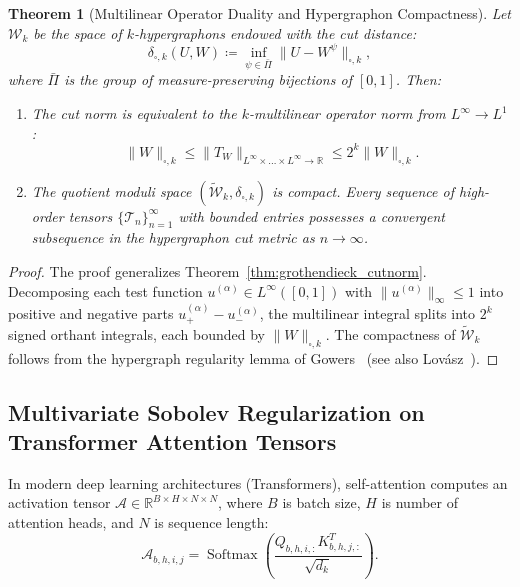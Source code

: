 \documentclass[11pt,a4paper,reqno]{amsart}
\newtheorem{theorem}{Theorem}[section]
\theoremstyle{definition}
\numberwithin{equation}{section}
\providecommand{\R}{\mathbb{R}}
\providecommand{\R}{\mathbb{R}}
\begin{document}
\begin{theorem}[Multilinear Operator Duality and Hypergraphon Compactness]
\label{thm:hypergraphon_compactness}
Let $\mathcal{W}_k$ be the space of $k$-hypergraphons endowed with the cut distance:
\begin{equation}
    \delta_{\square, k}(U, W) \coloneqq \inf_{\psi \in \bar{\Pi}} \|U - W^\psi\|_{\square, k},
\end{equation}
where $\bar{\Pi}$ is the group of measure-preserving bijections of $[0, 1]$. Then:
\begin{enumerate}[label=(\roman*)]
    \item The cut norm is equivalent to the $k$-multilinear operator norm from $L^\infty \to L^1$:
    \begin{equation}
        \|W\|_{\square, k} \le \|T_W\|_{L^\infty \times \dots \times L^\infty \to \R} \le 2^k \|W\|_{\square, k}.
    \end{equation}
    \item The quotient moduli space $(\widetilde{\mathcal{W}}_k, \delta_{\square, k})$ is \emph{compact}. Every sequence of high-order tensors $\{\mathcal{T}_n\}_{n=1}^\infty$ with bounded entries possesses a convergent subsequence in the hypergraphon cut metric as $n \to \infty$.
\end{enumerate}
\end{theorem}
\begin{proof}
The proof generalizes Theorem~\ref{thm:grothendieck_cutnorm}. Decomposing each test function $u^{(\alpha)} \in L^\infty([0, 1])$ with $\|u^{(\alpha)}\|_\infty \le 1$ into positive and negative parts $u_+^{(\alpha)} - u_-^{(\alpha)}$, the multilinear integral splits into $2^k$ signed orthant integrals, each bounded by $\|W\|_{\square, k}$. The compactness of $\widetilde{\mathcal{W}}_k$ follows from the hypergraph regularity lemma of Gowers~\cite{gowers2007hypergraph} (see also Lov{\'a}sz~\cite{lovasz2012large}).
\end{proof}

\subsection{Multivariate Sobolev Regularization on Transformer Attention Tensors}
\label{subsec:transformer_tensors}

In modern deep learning architectures (Transformers), self-attention computes an activation tensor $\mathcal{A} \in \R^{B \times H \times N \times N}$, where $B$ is batch size, $H$ is number of attention heads, and $N$ is sequence length:
\begin{equation}
    \mathcal{A}_{b, h, i, j} = \operatorname{Softmax}\left( \frac{Q_{b, h, i, :} K_{b, h, j, :}^T}{\sqrt{d_k}} \right).
\end{equation}
\end{document}
